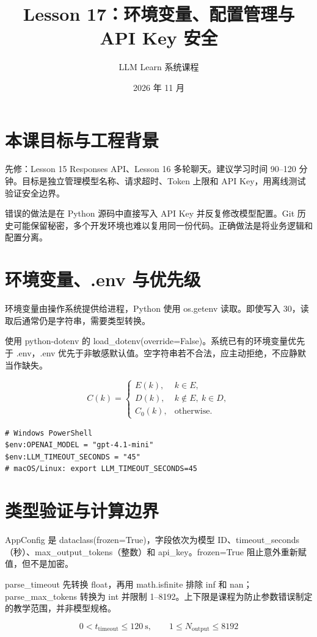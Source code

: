 \documentclass[UTF8,11pt,a4paper]{ctexart}
\begin{document}
\title{Lesson 17：环境变量、配置管理与 API Key 安全}
\author{LLM Learn 系统课程}
\date{2026 年 11 月}
\maketitle
\tableofcontents
\newpage
\section{本课目标与工程背景}
先修：Lesson 15 Responses API、Lesson 16 多轮聊天。建议学习时间 90–120 分钟。目标是独立管理模型名称、请求超时、Token 上限和 API Key，用离线测试验证安全边界。
\par
错误的做法是在 Python 源码中直接写入 API Key 并反复修改模型配置。Git 历史可能保留秘密，多个开发环境也难以复用同一份代码。正确做法是将业务逻辑和配置分离。
\par
\section{环境变量、.env 与优先级}
环境变量由操作系统提供给进程，Python 使用 os.getenv 读取。即使写入 30，读取后通常仍是字符串，需要类型转换。
\par
使用 python-dotenv 的 load\_dotenv(override=False)。系统已有的环境变量优先于 .env，.env 优先于非敏感默认值。空字符串若不合法，应主动拒绝，不应静默当作缺失。
\par
\[
C(k)=\begin{cases}E(k),& k\in E,\\D(k),&k\notin E,\ k\in D,\\C_0(k),&\text{otherwise.}\end{cases}
\]
\begin{Verbatim}[fontsize=\footnotesize,breaklines=true,breakanywhere=true]
# Windows PowerShell
$env:OPENAI_MODEL = "gpt-4.1-mini"
$env:LLM_TIMEOUT_SECONDS = "45"
# macOS/Linux: export LLM_TIMEOUT_SECONDS=45
\end{Verbatim}
\section{类型验证与计算边界}
AppConfig 是 dataclass(frozen=True)，字段依次为模型 ID、timeout\_seconds（秒）、max\_output\_tokens（整数）和 api\_key。frozen=True 阻止意外重新赋值，但不是加密。
\par
parse\_timeout 先转换 float，再用 math.isfinite 排除 inf 和 nan；parse\_max\_tokens 转换为 int 并限制 1–8192。上下限是课程为防止参数错误制定的教学范围，并非模型规格。
\par
\[
0<t_{\mathrm{timeout}}\leq120\ \mathrm{s},\qquad 1\leq N_{\mathrm{output}}\leq8192
\]
\end{document}
